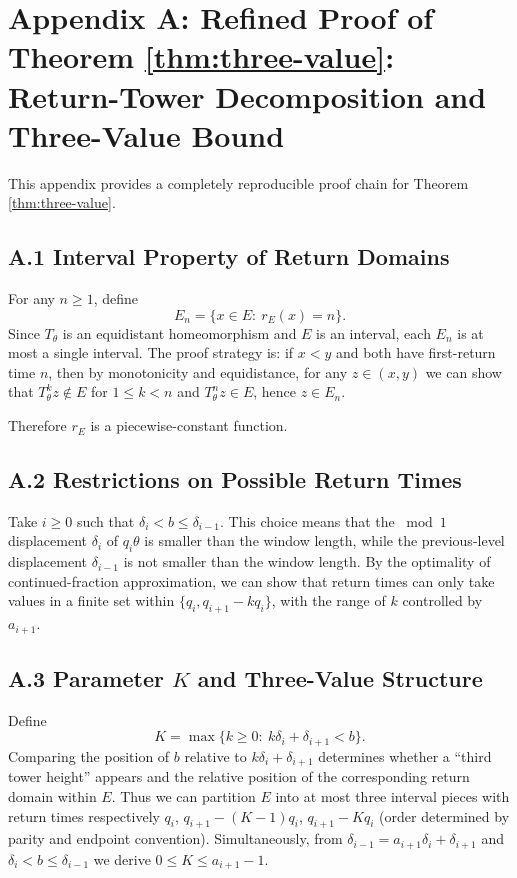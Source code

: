 \section{Appendix A: Refined Proof of Theorem \ref{thm:three-value}: Return-Tower Decomposition and Three-Value Bound}
\label{app:proof-thm31}

This appendix provides a completely reproducible proof chain for Theorem \ref{thm:three-value}.

\subsection*{A.1 Interval Property of Return Domains}

For any $n\ge 1$, define
\[
E_n=\{x\in E:\ r_E(x)=n\}.
\]
Since $T_\theta$ is an equidistant homeomorphism and $E$ is an interval, each $E_n$ is at most a single interval. The proof strategy is: if $x<y$ and both have first-return time $n$, then by monotonicity and equidistance, for any $z\in(x,y)$ we can show that $T_\theta^k z\notin E$ for $1\le k<n$ and $T_\theta^n z\in E$, hence $z\in E_n$.

Therefore $r_E$ is a piecewise-constant function.

\subsection*{A.2 Restrictions on Possible Return Times}

Take $i\ge 0$ such that $\delta_i<b\le \delta_{i-1}$. This choice means that the $\bmod 1$ displacement $\delta_i$ of $q_i\theta$ is smaller than the window length, while the previous-level displacement $\delta_{i-1}$ is not smaller than the window length. By the optimality of continued-fraction approximation, we can show that return times can only take values in a finite set within $\{q_i, q_{i+1}-k q_i\}$, with the range of $k$ controlled by $a_{i+1}$.

\subsection*{A.3 Parameter $K$ and Three-Value Structure}

Define
\[
K=\max\{k\ge 0:\ k\delta_i+\delta_{i+1}<b\}.
\]
Comparing the position of $b$ relative to $k\delta_i+\delta_{i+1}$ determines whether a ``third tower height'' appears and the relative position of the corresponding return domain within $E$. Thus we can partition $E$ into at most three interval pieces with return times respectively $q_i$, $q_{i+1}-(K-1)q_i$, $q_{i+1}-Kq_i$ (order determined by parity and endpoint convention). Simultaneously, from $\delta_{i-1}=a_{i+1}\delta_i+\delta_{i+1}$ and $\delta_i<b\le\delta_{i-1}$ we derive $0\le K\le a_{i+1}-1$.

